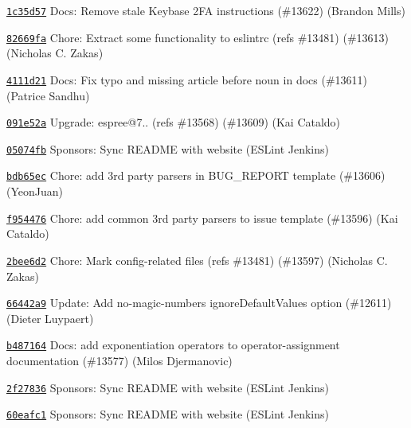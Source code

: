 \begin{DoxyItemize}
\item \href{https://github.com/eslint/eslint/commit/1c35d57b0a5f374cc55f1727a7561bcab1962e83}{\texttt{ {\ttfamily 1c35d57}}} Docs\+: Remove stale Keybase 2FA instructions (\#13622) (Brandon Mills)
\item \href{https://github.com/eslint/eslint/commit/82669fa66670a00988db5b1d10fe8f3bf30be84e}{\texttt{ {\ttfamily 82669fa}}} Chore\+: Extract some functionality to eslintrc (refs \#13481) (\#13613) (Nicholas C. Zakas)
\item \href{https://github.com/eslint/eslint/commit/4111d21a046b73892e2c84f92815a21ef4db63e1}{\texttt{ {\ttfamily 4111d21}}} Docs\+: Fix typo and missing article before noun in docs (\#13611) (Patrice Sandhu)
\item \href{https://github.com/eslint/eslint/commit/091e52ae1ca408f3e668f394c14d214c9ce806e6}{\texttt{ {\ttfamily 091e52a}}} Upgrade\+: espree@7.. (refs \#13568) (\#13609) (Kai Cataldo)
\item \href{https://github.com/eslint/eslint/commit/05074fb2c243e904e8c09d714ad9d084acdd80d2}{\texttt{ {\ttfamily 05074fb}}} Sponsors\+: Sync README with website (ESLint Jenkins)
\item \href{https://github.com/eslint/eslint/commit/bdb65ec2e672c9815bee356b61d1cd60a1072152}{\texttt{ {\ttfamily bdb65ec}}} Chore\+: add 3rd party parsers in BUG\+\_\+\+REPORT template (\#13606) (Yeon\+Juan)
\item \href{https://github.com/eslint/eslint/commit/f954476fb6b0664679c73babd5e8a0647572b81f}{\texttt{ {\ttfamily f954476}}} Chore\+: add common 3rd party parsers to issue template (\#13596) (Kai Cataldo)
\item \href{https://github.com/eslint/eslint/commit/2bee6d256ae0516c9a9003bb3fdca24ff93253b5}{\texttt{ {\ttfamily 2bee6d2}}} Chore\+: Mark config-\/related files (refs \#13481) (\#13597) (Nicholas C. Zakas)
\item \href{https://github.com/eslint/eslint/commit/66442a9faf9872db4a40f56dde28c48f4d02fc7b}{\texttt{ {\ttfamily 66442a9}}} Update\+: Add no-\/magic-\/numbers \textquotesingle{}ignore\+Default\+Values\textquotesingle{} option (\#12611) (Dieter Luypaert)
\item \href{https://github.com/eslint/eslint/commit/b487164d01dd0bf66fdf2df0e374ce1c3bdb0339}{\texttt{ {\ttfamily b487164}}} Docs\+: add exponentiation operators to operator-\/assignment documentation (\#13577) (Milos Djermanovic)
\item \href{https://github.com/eslint/eslint/commit/2f27836e989f3dfe236e34054b490febc359bc48}{\texttt{ {\ttfamily 2f27836}}} Sponsors\+: Sync README with website (ESLint Jenkins)
\item \href{https://github.com/eslint/eslint/commit/60eafc15075f38955cb6816bf1f0bcf6e6e6d3a6}{\texttt{ {\ttfamily 60eafc1}}} Sponsors\+: Sync README with website (ESLint Jenkins)
\end{DoxyItemize}

